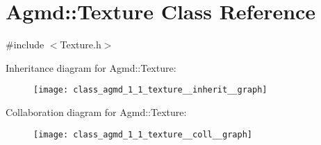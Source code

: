 \hypertarget{class_agmd_1_1_texture}{\section{Agmd\+:\+:Texture Class Reference}
\label{class_agmd_1_1_texture}
}


{\ttfamily \#include $<$Texture.\+h$>$}



Inheritance diagram for Agmd\+:\+:Texture\+:\nopagebreak
\begin{figure}[H]
\begin{center}
\leavevmode
\texttt{[image: class\_agmd\_1\_1\_texture\_\_inherit\_\_graph]}
\end{center}
\end{figure}


Collaboration diagram for Agmd\+:\+:Texture\+:\nopagebreak
\begin{figure}[H]
\begin{center}
\leavevmode
\texttt{[image: class\_agmd\_1\_1\_texture\_\_coll\_\_graph]}
\end{center}
\end{figure}
